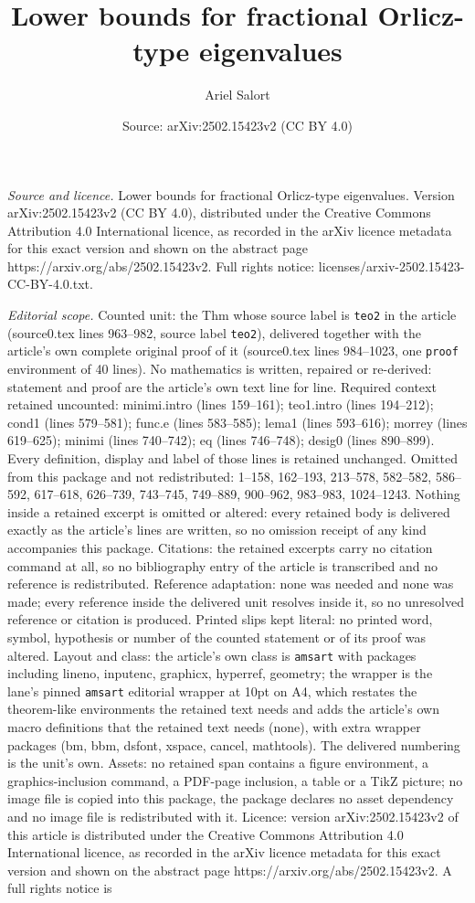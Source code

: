 \documentclass[10pt,a4paper]{amsart}
\title[Lower bounds for fractional Orlicz-type eigenvalues]{Lower bounds for fractional Orlicz-type eigenvalues}
\author{Ariel Salort}
\date{Source: arXiv:2502.15423v2 (CC BY 4.0)}
\begin{document}
\maketitle

\noindent\emph{Source and licence.} Lower bounds for fractional Orlicz-type eigenvalues. Version arXiv:2502.15423v2 (CC BY 4.0), distributed under the Creative Commons Attribution 4.0 International licence, as recorded in the arXiv licence metadata for this exact version and shown on the abstract page https://arxiv.org/abs/2502.15423v2. Full rights notice: licenses/arxiv-2502.15423-CC-BY-4.0.txt.\par\smallskip

\noindent\textit{Editorial scope.} Counted unit: the Thm whose source label is \texttt{teo2} in the article (source0.tex lines 963--982, source label \texttt{teo2}), delivered together with the article's own complete original proof of it (source0.tex lines 984--1023, one \texttt{proof} environment of 40 lines). No mathematics is written, repaired or re-derived: statement and proof are the article's own text line for line. Required context retained uncounted: minimi.intro (lines 159--161); teo1.intro (lines 194--212); cond1 (lines 579--581); func.e (lines 583--585); lema1 (lines 593--616); morrey (lines 619--625); minimi (lines 740--742); eq (lines 746--748); desig0 (lines 890--899). Every definition, display and label of those lines is retained unchanged. Omitted from this package and not redistributed: 1--158, 162--193, 213--578, 582--582, 586--592, 617--618, 626--739, 743--745, 749--889, 900--962, 983--983, 1024--1243. Nothing inside a retained excerpt is omitted or altered: every retained body is delivered exactly as the article's lines are written, so no omission receipt of any kind accompanies this package. Citations: the retained excerpts carry no citation command at all, so no bibliography entry of the article is transcribed and no reference is redistributed. Reference adaptation: none was needed and none was made; every reference inside the delivered unit resolves inside it, so no unresolved reference or citation is produced. Printed slips kept literal: no printed word, symbol, hypothesis or number of the counted statement or of its proof was altered. Layout and class: the article's own class is \texttt{amsart} with packages including lineno, inputenc, graphicx, hyperref, geometry; the wrapper is the lane's pinned \texttt{amsart} editorial wrapper at 10pt on A4, which restates the theorem-like environments the retained text needs and adds the article's own macro definitions that the retained text needs (none), with extra wrapper packages (bm, bbm, dsfont, xspace, cancel, mathtools). The delivered numbering is the unit's own. Assets: no retained span contains a figure environment, a graphics-inclusion command, a PDF-page inclusion, a table or a TikZ picture; no image file is copied into this package, the package declares no asset dependency and no image file is redistributed with it. Licence: version arXiv:2502.15423v2 of this article is distributed under the Creative Commons Attribution 4.0 International licence, as recorded in the arXiv licence metadata for this exact version and shown on the abstract page https://arxiv.org/abs/2502.15423v2. A full rights notice is 
\end{document}
